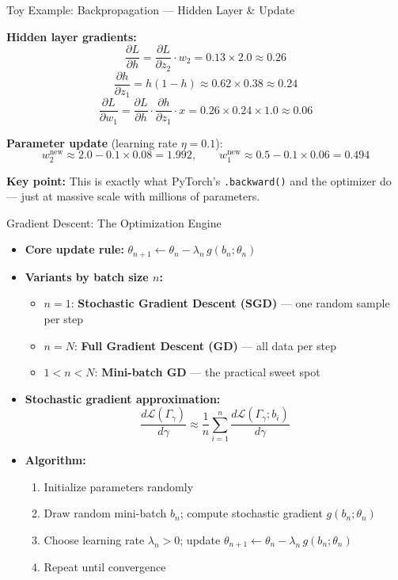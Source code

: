 \documentclass[10pt,english,aspectratio=169]{beamer}
\begin{document}
\begin{frame}{Toy Example: Backpropagation --- Hidden Layer \& Update}

\textbf{Hidden layer gradients:}
\[
\frac{\partial L}{\partial h}
= \frac{\partial L}{\partial z_2} \cdot w_2
= 0.13 \times 2.0 \approx 0.26
\]
\[
\frac{\partial h}{\partial z_1} = h(1-h)
\approx 0.62 \times 0.38 \approx 0.24
\]
\[
\frac{\partial L}{\partial w_1}
= \frac{\partial L}{\partial h} \cdot \frac{\partial h}{\partial z_1} \cdot x
= 0.26 \times 0.24 \times 1.0 \approx 0.06
\]

\medskip
\textbf{Parameter update} (learning rate $\eta = 0.1$):
\[
w_2^{\text{new}} \approx 2.0 - 0.1 \times 0.08 = 1.992, \qquad
w_1^{\text{new}} \approx 0.5 - 0.1 \times 0.06 = 0.494
\]

\medskip
\textbf{Key point:} This is exactly what PyTorch's \texttt{.backward()} and the optimizer do --- just at massive scale with millions of parameters.
\end{frame}

\begin{frame}{Gradient Descent: The Optimization Engine}

\begin{itemize}
\item \textbf{Core update rule:}
$\theta_{n+1} \leftarrow \theta_n - \lambda_n \, g(b_n; \theta_n)$

\medskip
\item \textbf{Variants by batch size $n$:}
\begin{itemize}
\item $n=1$: \textbf{Stochastic Gradient Descent (SGD)} --- one random sample per step
\item $n=N$: \textbf{Full Gradient Descent (GD)} --- all data per step
\item $1 < n < N$: \textbf{Mini-batch GD} --- the practical sweet spot
\end{itemize}

\medskip
\item \textbf{Stochastic gradient approximation:}
\[
\frac{d\mathcal{L}(\Gamma_{\gamma})}{d\gamma} \approx \frac{1}{n}\sum_{i=1}^{n} \frac{d\mathcal{L}(\Gamma_{\gamma}; b_i)}{d\gamma}
\]

\medskip
\item \textbf{Algorithm:}
\begin{enumerate}
\item Initialize parameters randomly
\item Draw random mini-batch $b_n$; compute stochastic gradient $g(b_n; \theta_n)$
\item Choose learning rate $\lambda_n > 0$; update $\theta_{n+1} \leftarrow \theta_n - \lambda_n \, g(b_n; \theta_n)$
\item Repeat until convergence
\end{enumerate}
\end{itemize}
\end{frame}
\end{document}
